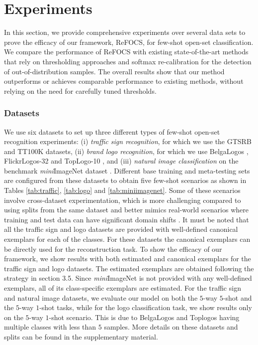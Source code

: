 
\section{Experiments}\label{Experiments}
In this section, we provide comprehensive experiments over several data sets to prove the efficacy of our framework, ReFOCS, for few-shot open-set classification. We compare the performance of ReFOCS with existing state-of-the-art methods that rely on thresholding approaches and softmax re-calibration for the detection of out-of-distribution samples. The overall results show that our method outperforms or achieves comparable performance to existing methods, without relying on the need for carefully tuned thresholds.


\subsubsection*{Datasets} 
We use six datasets to set up three different types of few-shot open-set recognition experiments: (i) \emph{traffic sign recognition}, for which we use the GTSRB \cite{gtsrb} and TT100K \cite{tt100k} datasets, (ii) \emph{brand logo recognition}, for which we use BelgaLogos \cite{belga1,belga2}, FlickrLogos-32 \cite{flickr} and TopLogo-10 \cite{toplogo}, and (iii) \emph{natural image classification} on the benchmark \textit{mini}ImageNet dataset \cite{match_net}. Different base training and meta-testing sets  are configured from these datasets to obtain five few-shot scenarios as shown in Tables \ref{tab:traffic}, \ref{tab:logo} and \ref{tab:miniimagenet}. Some of these scenarios involve cross-dataset experimentation, which is more challenging compared to using splits from the same dataset and better mimics real-world scenarios where training and test data can have significant domain shifts \cite{tseng2020cross}. It must be noted that all the traffic sign and logo datasets are provided with well-defined canonical exemplars for each of the classes. For these datasets the canonical exemplars can be directly used for the reconstruction task. To show the efficacy of our framework, we show results with both estimated and canonical exemplars for the traffic sign and logo datasets. The estimated exemplars are obtained following the strategy in section 3.5. Since \textit{mini}ImageNet is not provided with any well-defined exemplars, all of its class-specific exemplars are estimated. For the traffic sign and natural image datasets, we evaluate our model on both the $5$-way $5$-shot and the $5$-way $1$-shot tasks, while for the logo classification task, we show results only on the $5$-way $1$-shot scenario. This is due to BelgaLogos and Toplogos having multiple classes with less than $5$ samples. More details on these datasets and splits can be found in the supplementary material. 



